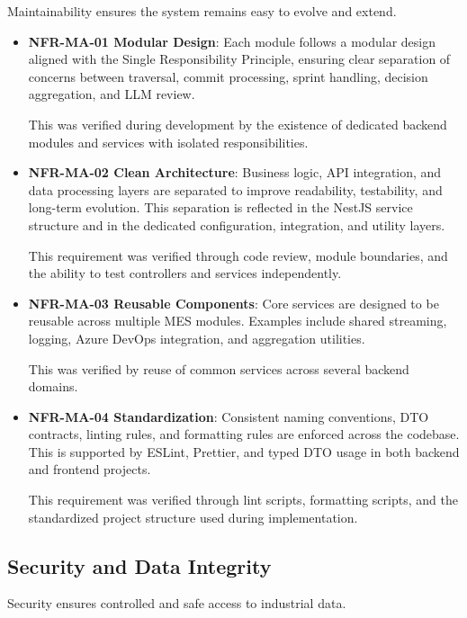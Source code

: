 Maintainability ensures the system remains easy to evolve and extend.

\begin{itemize}

\item \textbf{NFR-MA-01  Modular Design}:  
Each module follows a modular design aligned with the Single Responsibility Principle, ensuring clear separation of concerns between traversal, commit processing, sprint handling, decision aggregation, and LLM review.

This was verified during development by the existence of dedicated backend modules and services with isolated responsibilities.

\item \textbf{NFR-MA-02  Clean Architecture}:  
Business logic, API integration, and data processing layers are separated to improve readability, testability, and long-term evolution. This separation is reflected in the NestJS service structure and in the dedicated configuration, integration, and utility layers.

This requirement was verified through code review, module boundaries, and the ability to test controllers and services independently.

\item \textbf{NFR-MA-03  Reusable Components}:  
Core services are designed to be reusable across multiple MES modules. Examples include shared streaming, logging, Azure DevOps integration, and aggregation utilities.

This was verified by reuse of common services across several backend domains.

\item \textbf{NFR-MA-04  Standardization}:  
Consistent naming conventions, DTO contracts, linting rules, and formatting rules are enforced across the codebase. This is supported by ESLint, Prettier, and typed DTO usage in both backend and frontend projects.

This requirement was verified through lint scripts, formatting scripts, and the standardized project structure used during implementation.

\end{itemize}

% 
\subsection{Security and Data Integrity}

Security ensures controlled and safe access to industrial data.

